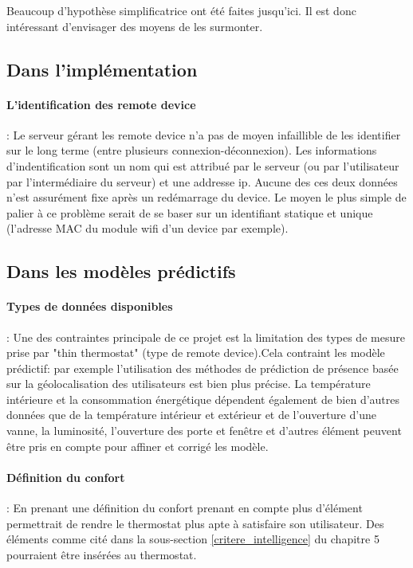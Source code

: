 \documentclass[11pt,a4paper,11pt]{report}
\begin{document}
Beaucoup d'hypothèse simplificatrice ont été faites jusqu'ici. Il est donc intéressant d'envisager des moyens de les surmonter.

\subsection*{Dans l'implémentation} %
\paragraph{L'identification des remote device}: Le serveur gérant les remote device n'a pas de moyen infaillible de les identifier sur le long terme (entre plusieurs connexion-déconnexion). Les informations d'indentification sont un nom qui est attribué par le serveur (ou par l'utilisateur par l'intermédiaire du serveur) et une addresse ip. Aucune des ces deux données n'est assurément fixe après un redémarrage du device. Le moyen le plus simple de palier à ce problème serait de se baser sur un identifiant statique et unique (l'adresse MAC du module wifi d'un device par exemple).

\subsection*{Dans les modèles prédictifs}
\paragraph{Types de données disponibles}: Une des contraintes principale de ce projet est la limitation des types de mesure prise par "thin thermostat" (type de remote device).Cela contraint les modèle prédictif: par exemple l'utilisation des méthodes de prédiction de présence basée sur la géolocalisation des utilisateurs est bien plus précise. La température intérieure et la consommation énergétique dépendent également de bien d'autres données que de la température intérieur et extérieur et de l'ouverture d'une vanne, la luminosité, l'ouverture des porte et fenêtre et d'autres élément peuvent être pris en compte pour affiner et corrigé les modèle.

\paragraph{Définition du confort}: En prenant une définition du confort prenant en compte plus d'élément permettrait de rendre le thermostat plus apte à satisfaire son utilisateur. Des éléments comme cité dans la sous-section \ref{critere_intelligence} du chapitre 5 pourraient être insérées au thermostat.
\end{document}
